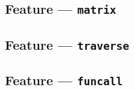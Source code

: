 
\subsection{Feature --- \texttt{matrix}} %
\label{sub:feature_matrix}


\subsection{Feature --- \texttt{traverse}} %
\label{sub:feature_traverse}


\subsection{Feature --- \texttt{funcall}} %
\label{sub:feature_funcall}


